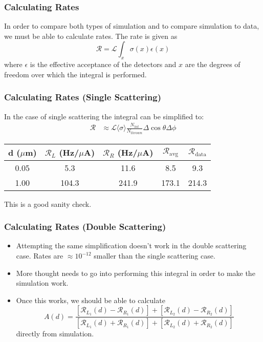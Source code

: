 \documentclass{beamer}
\begin{document}
\begin{frame}
 \frametitle{Calculating Rates}
  In order to compare both types of simulation and to compare simulation to data, we must be able to calculate rates. The rate is given as
  \begin{equation*}
   \mathcal{R} = \mathcal{L} \int_x \sigma(x)\epsilon(x)
  \end{equation*}
  where $\epsilon$ is the effective acceptance of the detectors and $x$ are the degrees of freedom over which the integral is performed.
\end{frame}

\begin{frame}
 \frametitle{Calculating Rates (Single Scattering)}
 In the case of single scattering the integral can be simplified to:
 \begin{align*}
  \mathcal{R} &\approx \mathcal{L} \langle\sigma\rangle \frac{N_{hit}}{N_{thrown}}\Delta\cos\theta\Delta\phi
 \end{align*}
 \begin{table} [h!]
 \centering
 \begin{tabular}{| c | c | c | c | c |} 
  \hline d ($\mu$m) & $\mathcal{R}_L$ (Hz/$\mu$A) & $\mathcal{R}_R$ (Hz/$\mu$A) & $\mathcal{R}_\mathrm{avg}$ & $\mathcal{R}_\mathrm{data}$ \\
  \hline 0.05 & 5.3 & 11.6 & 8.5 & 9.3\\ 
  \hline 1.00 & 104.3 & 241.9 & 173.1 & 214.3 \\
  \hline
 \end{tabular}

\end{table}
 This is a good sanity check.  
\end{frame}

\begin{frame}
 \frametitle{Calculating Rates (Double Scattering)}
 \begin{itemize}
  \item Attempting the same simplification doesn't work in the double scattering case. Rates are $\approx10^{-12}$ smaller than the single scattering case. 
  \item More thought needs to go into performing this integral in order to make the simulation work. 
  \item Once this works, we should be able to calculate
   \begin{equation*}
    A(d) = \frac{\left[\mathcal{R}_{L_1}(d)-\mathcal{R}_{R_1}(d)\right] + \left[\mathcal{R}_{L_2}(d)-\mathcal{R}_{R_2}(d)\right]}{\left[\mathcal{R}_{L_1}(d)+\mathcal{R}_{R_1}(d)\right] + \left[\mathcal{R}_{L_2}(d)+\mathcal{R}_{R_2}(d)\right]}
   \end{equation*}
   directly from simulation.
 \end{itemize}
\end{frame}
\end{document}
